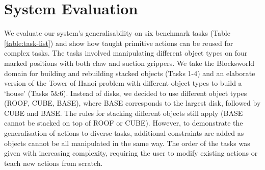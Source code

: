 \section{System Evaluation}
\label{sec:syseval}
We evaluate our system's generalisability on six benchmark tasks (Table \ref{table:task-list}) and show how taught primitive actions can be reused for complex tasks.
The tasks involved manipulating different object types on four marked positions with both claw and suction grippers.
We take the Blocksworld domain \cite{slaney2001blocks} for building and rebuilding stacked objects (Tasks 1-4) and an elaborate version of the Tower of Hanoi problem with different object types to build a `house' (Tasks 5\&6).
Instead of disks, we decided to use different object types (ROOF, CUBE, BASE), where BASE corresponds to the largest disk, followed by CUBE and BASE.
The rules for stacking different objects still apply (\eg BASE cannot be stacked on top of ROOF or CUBE).
However, to demonstrate the generalisation of actions to diverse tasks, additional constraints are added as objects cannot be all manipulated in the same way.
The order of the tasks was given with increasing complexity, requiring the user to modify existing actions or teach new actions from scratch.


